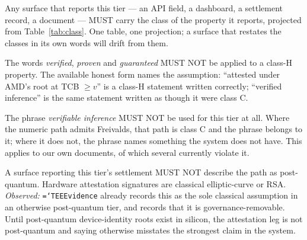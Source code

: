 \documentclass[11pt,a4paper]{article}
\newcommand{\code}[1]{\texttt{\hyphenchar\font=`\-\relax #1}}
\newcommand{\req}[1]{\textbf{#1}}
\begin{document}
\begin{description}[leftmargin=1.6em]
\item[\req{C1}] Any surface that reports this tier --- an API field, a dashboard, a
settlement record, a document --- MUST carry the class of the property it reports,
projected from Table~\ref{tab:class}. One table, one projection; a surface that
restates the classes in its own words will drift from them.

\item[\req{C2}] The words \emph{verified}, \emph{proven} and \emph{guaranteed} MUST
NOT be applied to a class-H property. The available honest form names the assumption:
``attested under AMD's root at TCB $\geq v$'' is a class-H statement written
correctly; ``verified inference'' is the same statement written as though it were
class C.

\item[\req{C3}] The phrase \emph{verifiable inference} MUST NOT be used for this
tier at all. Where the numeric path admits Freivalds, that path is class C and the
phrase belongs to it; where it does not, the phrase names something the system does
not have. This applies to our own documents, of which several currently violate it.

\item[\req{C4}] A surface reporting this tier's settlement MUST NOT describe the
path as post-quantum. Hardware attestation signatures are classical elliptic-curve
or RSA. \emph{Observed:} \code{TEEEvidence} already records this as the sole
classical assumption in an otherwise post-quantum tier, and records that it is
governance-removable. Until post-quantum device-identity roots exist in silicon, the
attestation leg is not post-quantum and saying otherwise misstates the strongest
claim in the system.
\end{description}
\end{document}
